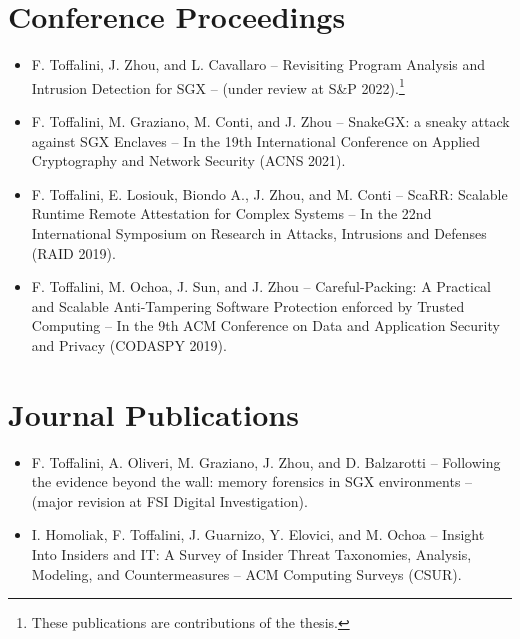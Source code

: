 \documentclass[
11pt, %
oneside, %
english, %
singlespacing, %
headsepline, %
]{MastersDoctoralThesis} %
\makeatletter
\newcommand\footnoteref[1]{\protected@xdef\@thefnmark{\ref{#1}}\@footnotemark}
\makeatother
\begin{document}
\begin{publications}
\addchaptertocentry{\publicationsname} %

\section*{Conference Proceedings}
\begin{itemize}
	
	\item F. Toffalini, J. Zhou, and L. Cavallaro -- Revisiting Program 
	Analysis and Intrusion Detection for SGX -- (under review at S\&P 
	2022).\footnote[$\dagger$]{\label{inthesis}These publications are 
	contributions of the thesis.}
	
	\item F. Toffalini, M. Graziano, M. Conti, and J. Zhou -- SnakeGX: a sneaky 
	attack against SGX Enclaves -- In the 19th International Conference on 
	Applied Cryptography and Network Security (ACNS 
	2021).\footnoteref{inthesis}
	
	\item F. Toffalini, E. Losiouk, Biondo A., J. Zhou, and M. Conti -- ScaRR: 
	Scalable Runtime Remote Attestation for Complex Systems -- In the 22nd 
	International Symposium on Research in Attacks, Intrusions and Defenses 
	(RAID 2019).\footnoteref{inthesis}
	
	\item F. Toffalini, M. Ochoa, J. Sun, and J. Zhou -- Careful-Packing: A 
	Practical and Scalable Anti-Tampering Software Protection enforced by 
	Trusted Computing -- In the 9th ACM Conference on Data and Application 
	Security and Privacy (CODASPY 2019).\footnoteref{inthesis}
	
\end{itemize}

\section*{Journal Publications}
\begin{itemize}
	\item F. Toffalini, A. Oliveri, M. Graziano, J. Zhou, and D. Balzarotti -- 
	Following the evidence beyond the wall:	memory forensics in SGX 
	environments -- (major revision at FSI Digital 
	Investigation).\footnoteref{inthesis}
	
	\item I. Homoliak, F. Toffalini, J. Guarnizo, Y. Elovici, and M. 
	Ochoa -- Insight Into Insiders and IT: A Survey of Insider Threat 
	Taxonomies, Analysis, Modeling, and Countermeasures -- ACM Computing 
	Surveys (CSUR).
	

\end{itemize}
\end{publications}
\end{document}
